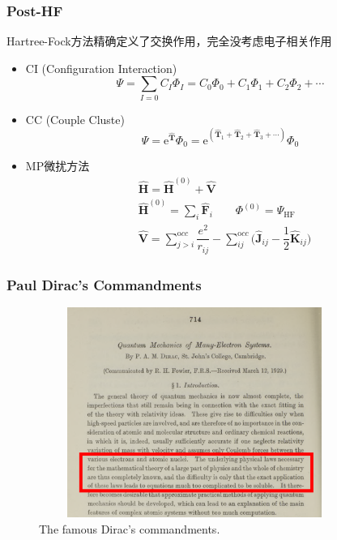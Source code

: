 \frame
{
	\frametitle{\textrm{Post-HF}}
	\textrm{Hartree-Fock}方法精确定义了交换作用，完全没考虑电子相关作用
	\begin{itemize}
		\item \textrm{CI (Configuration Interaction)}
	$$\Psi=\sum_{I=0}C_I\Phi_I=C_0\Phi_0+C_1\Phi_1+C_2\Phi_2+\cdots$$
		\item \textrm{CC (Couple Cluste)}\\
			\begin{displaymath}
				\Psi=\mathrm{e}^{\hat{\mathbf T}}\Phi_0=\mathrm{e}^{(\hat{\mathbf T}_1+\hat{\mathbf T}_2+\hat{\mathbf T}_3+\cdots)}\Phi_0
			\end{displaymath}
		\item \textrm{MP}微扰方法
			\begin{displaymath}
				\begin{aligned}
					&\hat{\mathbf H}=\hat{\mathbf H}^{(0)}+\hat{\mathbf V} \\
					&\hat{\mathbf H}^{(0)}=\sum_i\hat{\mathbf F}_i \qquad \Phi^{(0)}=\Psi_{\mathrm{HF}}\\ 
					&\hat{\mathbf V}=\sum_{j>i}^{\mathrm occ}\dfrac{e^2}{r_{ij}}-\sum_{ij}^{\mathrm occ}\big(\hat{\mathbf J}_{ij}-\dfrac12\hat{\mathbf K}_{ij}\big)
				\end{aligned}
			\end{displaymath}
	\end{itemize}
}

\frame
{
	\frametitle{\rm{Paul Dirac's Commandments}}
\begin{figure}[h!]
\centering
\vspace{-10.5pt}
\includegraphics[height=2.7in,width=4.0in,viewport=0 0 1200 890,clip]{Figures/Dirac_comment.png}
\caption{\tiny \textrm{The famous Dirac's commandments.}}%
\label{Dirac_Command}
\end{figure}
}

